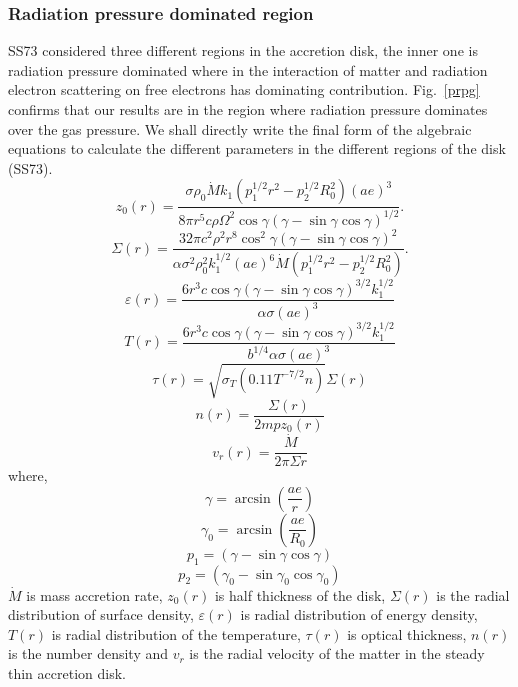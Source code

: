 \documentclass[useAMS,usenatbib]{mn2e}
\begin{document}
\subsubsection{Radiation pressure dominated region}
SS73 considered three different regions in the accretion disk, the inner one is radiation pressure dominated where in the interaction of matter and radiation electron scattering on free electrons has dominating contribution. Fig.~\ref{prpg} confirms that our results are in the region where radiation pressure dominates over the gas pressure. We shall directly write the final form of the algebraic equations to calculate the different parameters in the different regions of the disk (SS73).
\begin{equation}
z_0(r) = \frac{\sigma\rho_0\dot{M}k_1\left(p_1^{1/2}r^2 - p_2^{1/2}R_0^2\right)(ae)^3}{8\pi r^5 c \rho \Omega^2\cos\gamma(\gamma - \sin\gamma\cos\gamma)^{1/2}}.
\end{equation}
\begin{equation}
\Sigma(r) = \frac{32\pi c^2\rho^2 r^8 \cos^2{\gamma}(\gamma - \sin\gamma\cos\gamma)^2}{\alpha\sigma^2\rho_0^2 k_1^{1/2}(ae)^6\dot{M}\left(p_1^{1/2}r^2 - p_2^{1/2}R_0^2\right)}.
\end{equation}
\begin{equation}
\varepsilon(r) = \frac{6 r^3 c \cos\gamma(\gamma - \sin\gamma\cos\gamma)^{3/2}k_1^{1/2}}{\alpha\sigma (ae)^3}
\end{equation}
\begin{equation}
T(r) = \frac{6r^3 c \cos\gamma (\gamma - \sin\gamma\cos\gamma)^{3/2}k_1^{1/2}}{b^{1/4}\alpha\sigma (ae)^3}
\end{equation}
\begin{equation}
\tau (r) = \sqrt{\sigma_T(0.11 T^{-7/2}n)}\Sigma(r)
\end{equation}
\begin{equation}
n(r) = \frac{\Sigma(r)}{2mpz_0(r)}
\end{equation}
\begin{equation}
v_r(r) = \frac{\dot{M}}{2\pi\Sigma r}
\end{equation}
where, 
\begin{equation} 
\gamma = \arcsin(\frac{ae}{r}) 
\end{equation}
\begin{equation}
\gamma_0 = \arcsin(\frac{ae}{R_0})
\end{equation}
\begin{equation}
p_1 = (\gamma - \sin\gamma\cos\gamma)
\end{equation}
\begin{equation}
p_2 = (\gamma_0 - \sin\gamma_0\cos\gamma_0)
\end{equation}
$\dot{M}$ is mass accretion rate, $z_0(r)$ is half thickness of the disk, $\Sigma(r)$ is the radial distribution of surface density, $\varepsilon(r)$ is radial distribution of energy density, $T(r)$ is radial distribution of the temperature, $\tau(r)$ is optical thickness, $n(r)$ is the number density and $v_r$ is the radial velocity of the matter in the steady thin accretion disk.
\end{document}
